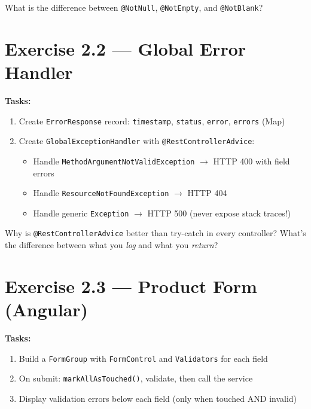 \documentclass[12pt,a4paper]{report}
\begin{document}
\begin{thinkbox}
What is the difference between \texttt{@NotNull}, \texttt{@NotEmpty}, and \texttt{@NotBlank}?
\end{thinkbox}

\section{Exercise 2.2 --- Global Error Handler}

\textbf{Tasks:}
\begin{enumerate}
    \item Create \texttt{ErrorResponse} record: \texttt{timestamp}, \texttt{status}, \texttt{error}, \texttt{errors} (Map)
    \item Create \texttt{GlobalExceptionHandler} with \texttt{@RestControllerAdvice}:
    \begin{itemize}
        \item Handle \texttt{MethodArgumentNotValidException} $\to$ HTTP 400 with field errors
        \item Handle \texttt{ResourceNotFoundException} $\to$ HTTP 404
        \item Handle generic \texttt{Exception} $\to$ HTTP 500 (never expose stack traces!)
    \end{itemize}
\end{enumerate}

\begin{thinkbox}
Why is \texttt{@RestControllerAdvice} better than try-catch in every controller? What's the difference between what you \emph{log} and what you \emph{return}?
\end{thinkbox}

\section{Exercise 2.3 --- Product Form (Angular)}

\textbf{Tasks:}
\begin{enumerate}
    \item Build a \texttt{FormGroup} with \texttt{FormControl} and \texttt{Validators} for each field
    \item On submit: \texttt{markAllAsTouched()}, validate, then call the service
    \item Display validation errors below each field (only when touched AND invalid)
\end{enumerate}
\end{document}
